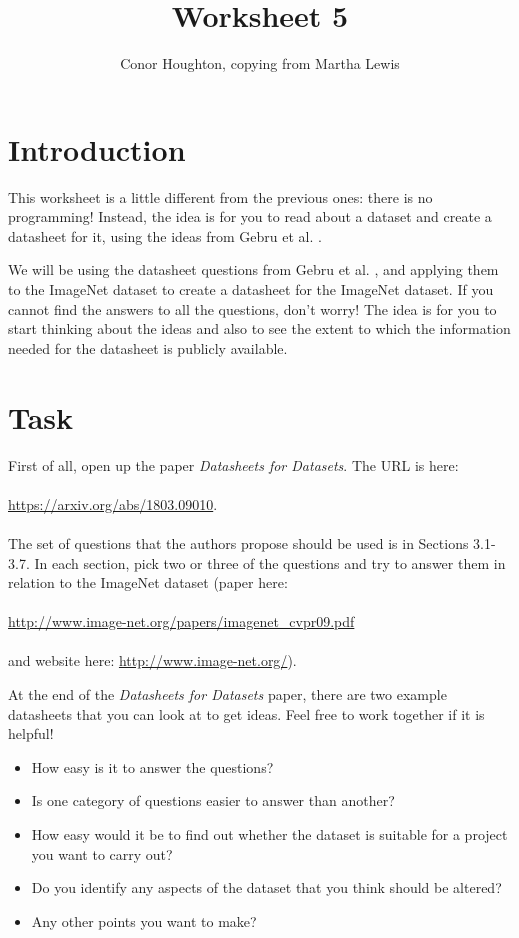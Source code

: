 \documentclass[a4paper,12pt]{article}
\title{Worksheet 5}
\author{Conor Houghton, copying from Martha Lewis}
\date{}
\begin{document}
\maketitle

\section{Introduction}

This worksheet is a little different from the previous ones: there is
no programming! Instead, the idea is for you to read about a dataset
and create a datasheet for it, using the ideas from Gebru et
al. \cite{gebru2021datasheets}.

We will be using the datasheet questions from Gebru et
al. \cite{gebru2021datasheets}, and applying them to the ImageNet
dataset \cite{deng2009imagenet} to create a datasheet for the ImageNet
dataset. If you cannot find the answers to all the questions, don’t
worry! The idea is for you to start thinking about the ideas and also
to see the extent to which the information needed for the datasheet is
publicly available.

\section{Task}

First of all, open up the paper \textit{Datasheets for Datasets}. The
URL is here:\\
\\
\url{https://arxiv.org/abs/1803.09010}.\\
\\
The set of questions that the authors propose should be used is in
Sections 3.1-3.7. In each section, pick two or three of the questions
and try to answer them in relation to the ImageNet dataset (paper
here:\\ \\ \url{http://www.image-net.org/papers/imagenet_cvpr09.pdf}\\ \\ and
website here: \url{http://www.image-net.org/}).

At the end of the \textit{Datasheets for Datasets} paper, there are two example datasheets that you can look at to get ideas. Feel free to work together if it is helpful!

\begin{itemize}
    \item How easy is it to answer the questions?
    \item Is one category of questions easier to answer than another?
    \item How easy would it be to find out whether the dataset is suitable for a project you want to carry out?
    \item Do you identify any aspects of the dataset that you think should be altered?
    \item Any other points you want to make?
\end{itemize}
\end{document}
